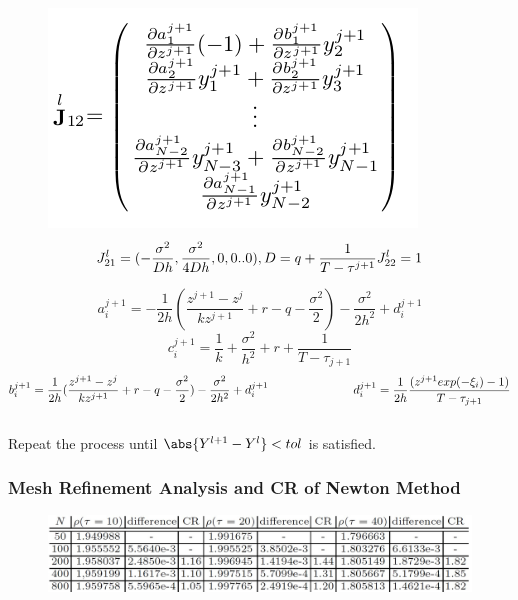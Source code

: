 \documentclass{beamer}
\begin{document}
\begin{frame}

\begin{figure}[!htb]
	\centering 
	\includegraphics[width=0.7\linewidth]{image1.png}
	\[
        J_{21}^{l} = (-\frac{\sigma^{2}}{Dh},\frac{\sigma^{2}}{4Dh},0,0..0) ,D=q+\frac{1}{T-\tau^{j+1}}\\
        J_{22}^l=1
    \]
\end{figure}
\end{frame}
\begin{frame}
    \begin{equation}
        a_{i}^{j+1} = -\frac{1}{2h}(\frac{z^{j+1} - z^{j}}{kz^{j+1}} + r - q - \frac{\sigma^{2}}{2}) -\frac{\sigma^2}{2h^{2}} + d_{i}^{j+1}
    \end{equation}
    \begin{equation}
        c_{i}^{j+1} = \frac{1}{k} + \frac{\sigma^2}{h^{2}} + r + \frac{1}{T - \tau_{j+1}}
    \end{equation}
    \[
        b_{i}^{j+1} = \frac{1}{2h}(\frac{z^{j+1} - z^{j}}{kz^{j+1}} + r - q - \frac{\sigma^{2}}{2}) - \frac{\sigma^2}{2h^{2}} + d_{i}^{j+1}\\
        \hspace{25mm}d_{i}^{j+1}=\frac{1}{2h}\frac{(z^{j+1}exp(-\xi_{i})-1)}{T-\tau_{j+1}}
    \]
    \\Repeat the process until $\abs{Y^{l+1}-Y^{l}}<tol$ is satisfied.
\end{frame}
\begin{frame}
\frametitle{Mesh Refinement Analysis and CR of Newton Method}
\begin{figure}[!htb]
	\centering 
	\includegraphics[width=1\linewidth]{mesh_refinement_analysis_CR.jpg}
	
\end{figure}
\end{frame}
\end{document}
